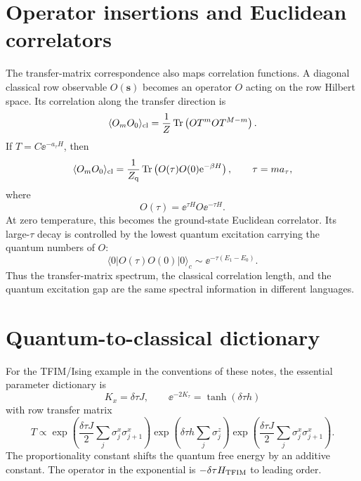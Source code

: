 \section{Operator insertions and Euclidean correlators}
\label{sec:operator-insertions-euclidean-correlators}

The transfer-matrix correspondence also maps correlation functions. A diagonal
classical row observable $O(\bm{s})$ becomes an operator $O$ acting on the row
Hilbert space. Its correlation along the transfer direction is
\begin{equation}
\label{eq:transfer-correlator-as-quantum-correlator}
    \langle O_m O_0\rangle_{\rm cl}
    =
    \frac{1}{Z}
    \operatorname{Tr}\left(O T^m O T^{M-m}\right).
\end{equation}
If $T=C\ee^{-a_\tau H}$, then
\begin{equation}
\label{eq:euclidean-quantum-correlator}
    \langle O_m O_0\rangle_{\rm cl}
    =
    \frac{1}{Z_{\rm q}}
    \operatorname{Tr}\left(
        O(\tau)O(0)\mathrm{e}^{-\beta H}
    \right),
    \qquad
    \tau=m a_\tau,
\end{equation}
where
\begin{equation}
\label{eq:imaginary-time-heisenberg-operator}
    O(\tau)=\ee^{\tau H}O\ee^{-\tau H}.
\end{equation}
At zero temperature, this becomes the ground-state Euclidean correlator. Its
large-$\tau$ decay is controlled by the lowest quantum excitation carrying the
quantum numbers of $O$:
\begin{equation}
\label{eq:euclidean-spectral-decay}
    \langle 0\vert O(\tau)O(0)\vert0\rangle_c
    \sim
    \ee^{-\tau(E_1-E_0)}.
\end{equation}
Thus the transfer-matrix spectrum, the classical correlation length, and the
quantum excitation gap are the same spectral information in different languages.

\section{Quantum-to-classical dictionary}
\label{sec:quantum-classical-dictionary}

For the TFIM/Ising example in the conventions of these notes, the essential
parameter dictionary is
\begin{equation}
\label{eq:tfim-ising-dictionary}
    \boxed{
    K_x=\delta\tau J,
    \qquad
    \ee^{-2K_\tau}=\tanh(\delta\tau h)
    }
\end{equation}
with row transfer matrix
\begin{equation}
\label{eq:tfim-ising-transfer-final}
    T
    \propto
    \exp\left(
        \frac{\delta\tau J}{2}
        \sum_j\sigma_j^x\sigma_{j+1}^x
    \right)
    \exp\left(
        \delta\tau h\sum_j\sigma_j^z
    \right)
    \exp\left(
        \frac{\delta\tau J}{2}
        \sum_j\sigma_j^x\sigma_{j+1}^x
    \right).
\end{equation}
The proportionality constant shifts the quantum free energy by an additive
constant. The operator in the exponential is $-\delta\tau H_{\rm TFIM}$ to
leading order.

